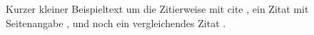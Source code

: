\documentclass[a4paper, pdftex, ngerman, 12pt]{article}
\begin{document}
Kurzer kleiner Beispieltext um die Zitierweise mit cite \cite{Carr2008}, ein Zitat mit Seitenangabe \cite[S. 13]{Culik1993}, und noch ein vergleichendes Zitat \cite[vgl.][S. 15]{Erdogmus2009}.


\end{document}
